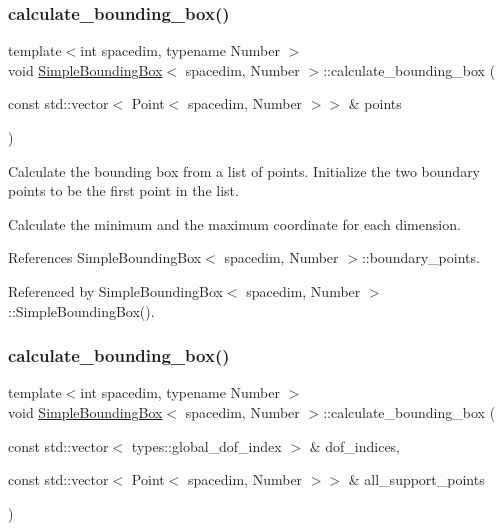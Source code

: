 \subsubsection{\texorpdfstring{calculate\+\_\+bounding\+\_\+box()}{calculate\_bounding\_box()}\hspace{0.1cm}{\footnotesize\ttfamily [1/2]}}
{\footnotesize\ttfamily template$<$int spacedim, typename Number $>$ \\
void \hyperlink{classSimpleBoundingBox}{Simple\+Bounding\+Box}$<$ spacedim, Number $>$\+::calculate\+\_\+bounding\+\_\+box (\begin{DoxyParamCaption}\item[{const std\+::vector$<$ Point$<$ spacedim, Number $>$$>$ \&}]{points }\end{DoxyParamCaption})\hspace{0.3cm}{\ttfamily [private]}}

Calculate the bounding box from a list of points. Initialize the two boundary points to be the first point in the list.

Calculate the minimum and the maximum coordinate for each dimension.

References Simple\+Bounding\+Box$<$ spacedim, Number $>$\+::boundary\+\_\+points.



Referenced by Simple\+Bounding\+Box$<$ spacedim, Number $>$\+::\+Simple\+Bounding\+Box().

\mbox{\label{classSimpleBoundingBox_aafff59e6c56578638d58ca6095024bac}} 
\subsubsection{\texorpdfstring{calculate\+\_\+bounding\+\_\+box()}{calculate\_bounding\_box()}\hspace{0.1cm}{\footnotesize\ttfamily [2/2]}}
{\footnotesize\ttfamily template$<$int spacedim, typename Number $>$ \\
void \hyperlink{classSimpleBoundingBox}{Simple\+Bounding\+Box}$<$ spacedim, Number $>$\+::calculate\+\_\+bounding\+\_\+box (\begin{DoxyParamCaption}\item[{const std\+::vector$<$ types\+::global\+\_\+dof\+\_\+index $>$ \&}]{dof\+\_\+indices,  }\item[{const std\+::vector$<$ Point$<$ spacedim, Number $>$$>$ \&}]{all\+\_\+support\+\_\+points }\end{DoxyParamCaption})\hspace{0.3cm}{\ttfamily [private]}}

